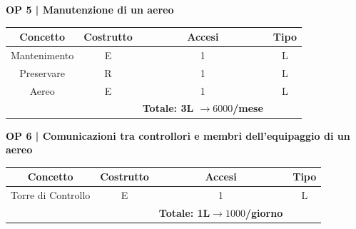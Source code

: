 \vspace{.6cm}


\textbf{\small OP 5 | Manutenzione di un aereo}\\

\begin{tabular}{ c c c c} %
	\hline
	\textbf{Concetto} & \textbf{Costrutto} & \textbf{Accesi} & \textbf{Tipo}\\
	\hline
	\textsf{\small Mantenimento} & \textsf{\small E} & \textsf{\small 1} &  \textsf{\small L}\\
	\hline
	\textsf{\small Preservare} & \textsf{\small R} & \textsf{\small 1} &  \textsf{\small L}\\
	\hline
	\textsf{\small Aereo} & \textsf{\small E} & \textsf{\small 1} &  \textsf{\small L}\\
	\hline
	\textsf{\small } & \textsf{\small } & \textbf{Totale: 3L $\rightarrow 6000$/mese} \textsf{\small } & \textsf{\small }\\ %
	\hline
\end{tabular}

\vspace{.6cm}


\textbf{\small OP 6 | Comunicazioni tra controllori e membri dell'equipaggio di un aereo}\\

\begin{tabular}{ c c c c} %
	\hline
	\textbf{Concetto} & \textbf{Costrutto} & \textbf{Accesi} & \textbf{Tipo}\\
	\hline
	\textsf{\small Torre di Controllo} & \textsf{\small E} & \textsf{\small 1} &  \textsf{\small L}\\
	\hline
	\textsf{\small } & \textsf{\small } & \textbf{Totale: 1L$\rightarrow 1000$/giorno } \textsf{\small } & \textsf{\small }\\ 
	\hline
\end{tabular}

\vspace{.6cm}

